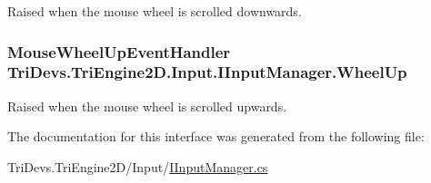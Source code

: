 Raised when the mouse wheel is scrolled downwards. 

\hypertarget{interface_tri_devs_1_1_tri_engine2_d_1_1_input_1_1_i_input_manager_ad1537ccd8ae47fbfa29fb1ae44da8cb4}{
\subsubsection[{Wheel\-Up}]{\setlength{\rightskip}{0pt plus 5cm}Mouse\-Wheel\-Up\-Event\-Handler Tri\-Devs.\-Tri\-Engine2\-D.\-Input.\-I\-Input\-Manager.\-Wheel\-Up}}\label{interface_tri_devs_1_1_tri_engine2_d_1_1_input_1_1_i_input_manager_ad1537ccd8ae47fbfa29fb1ae44da8cb4}


Raised when the mouse wheel is scrolled upwards. 



The documentation for this interface was generated from the following file\-:\begin{DoxyCompactItemize}
\item 
Tri\-Devs.\-Tri\-Engine2\-D/\-Input/\hyperlink{_i_input_manager_8cs}{I\-Input\-Manager.\-cs}\end{DoxyCompactItemize}
